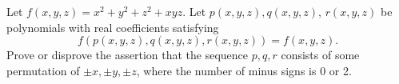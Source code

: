 Let $f(x,y,z) = x^2+y^2+z^2+xyz$. Let $p(x,y,z), q(x,y,z)$, $r(x,y,z)$
be polynomials with real coefficients satisfying
\[
f(p(x,y,z), q(x,y,z), r(x,y,z)) = f(x,y,z).
\]
Prove or disprove the assertion that the sequence $p,q,r$ consists of
some permutation of $\pm x, \pm y, \pm z$, where the number of minus
signs is 0 or 2.
